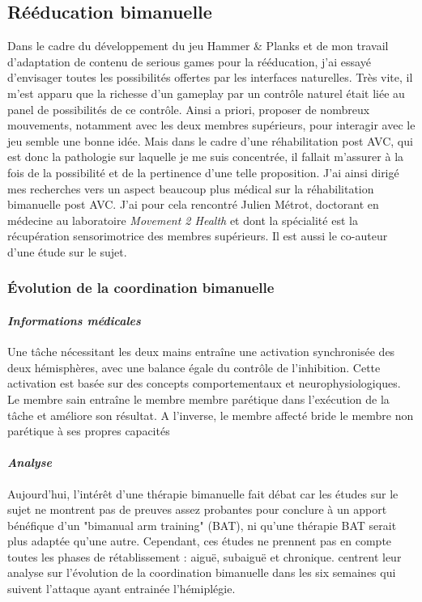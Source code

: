 	
	\subsection{Rééducation bimanuelle} \label{bilateral}
	Dans le cadre du développement du jeu Hammer \& Planks et de mon travail d'adaptation de contenu de serious games pour la rééducation, j'ai essayé d'envisager toutes les possibilités offertes par les interfaces naturelles. Très vite, il m'est apparu que la richesse d'un gameplay par un contrôle naturel était liée au panel de possibilités de ce contrôle. Ainsi a priori, proposer de nombreux mouvements, notamment avec les deux membres supérieurs, pour interagir avec le jeu semble une bonne idée. Mais dans le cadre d'une réhabilitation post AVC, qui est donc la pathologie sur laquelle je me suis concentrée, il fallait m'assurer à la fois de la possibilité et de la pertinence d'une telle proposition. J'ai ainsi dirigé mes recherches vers un aspect beaucoup plus médical sur la réhabilitation bimanuelle post AVC. J'ai pour cela rencontré Julien Métrot, doctorant en médecine au laboratoire \emph{Movement 2 Health} et dont la spécialité est la récupération sensorimotrice des membres supérieurs. Il est aussi le co-auteur d'une étude sur le sujet.
	
		\subsubsection*{Évolution de la coordination bimanuelle} 
		
		\paragraph{\emph{Informations médicales}\\}
Une tâche nécessitant les deux mains entraîne une activation synchronisée des deux
hémisphères, avec une balance égale du contrôle de l'inhibition. Cette activation est basée sur des concepts comportementaux et neurophysiologiques.\\
Le membre sain entraîne le membre membre parétique dans l'exécution de la tâche et améliore son
résultat. A l'inverse, le membre affecté bride le membre non parétique à ses propres capacités		
		\paragraph{\emph{Analyse}\\}
Aujourd'hui, l'intérêt d'une thérapie bimanuelle fait débat car les études sur le sujet ne montrent pas de preuves assez probantes pour conclure à un apport bénéfique d'un "bimanual arm training" (BAT), ni qu'une thérapie BAT serait plus adaptée qu'une autre. Cependant, ces études ne prennent pas en compte toutes les phases de rétablissement : aiguë, subaiguë et chronique.\newline
[Metrot et al, 2013]\cite{Metr13} centrent leur analyse sur l'évolution de la coordination bimanuelle dans les six semaines qui suivent l'attaque ayant entrainée l'hémiplégie.

